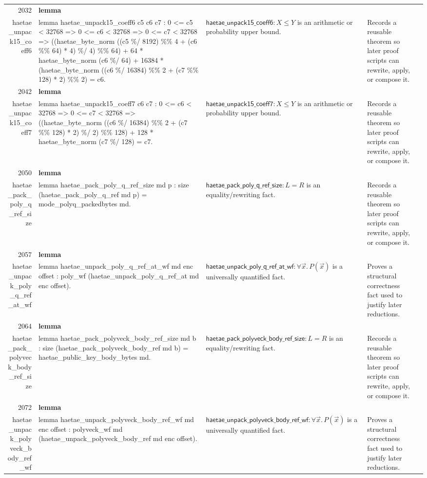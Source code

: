 \documentclass[10pt]{article}
\newcommand{\ec}[1]{\begingroup\ttfamily\scriptsize #1\endgroup}
\begin{document}
\begin{longtable}{r L{0.17\textwidth} L{0.26\textwidth} L{0.27\textwidth} L{0.20\textwidth}}
2032 & \textbf{lemma}\\\ec{haetae\_unpack15\_coeff6} & \ec{lemma haetae\_unpack15\_coeff6 c5 c6 c7 : 0 <= c5 < 32768 => 0 <= c6 < 32768 => 0 <= c7 < 32768 => ((haetae\_byte\_norm ((c5 \%/ 8192) \%\% 4 + (c6 \%\% 64) * 4) \%/ 4) \%\% 64) + 64 * haetae\_byte\_norm (c6 \%/ 64) + 16384 * (haetae\_byte\_norm ((c6 \%/ 16384) \%\% 2 + (c7 \%\% 128) * 2) \%\% 2) = c6.} & \(\mathsf{haetae\_unpack15\_coeff6} : X \le Y\) is an arithmetic or probability upper bound. & Records a reusable theorem so later proof scripts can rewrite, apply, or compose it. \\
2042 & \textbf{lemma}\\\ec{haetae\_unpack15\_coeff7} & \ec{lemma haetae\_unpack15\_coeff7 c6 c7 : 0 <= c6 < 32768 => 0 <= c7 < 32768 => ((haetae\_byte\_norm ((c6 \%/ 16384) \%\% 2 + (c7 \%\% 128) * 2) \%/ 2) \%\% 128) + 128 * haetae\_byte\_norm (c7 \%/ 128) = c7.} & \(\mathsf{haetae\_unpack15\_coeff7} : X \le Y\) is an arithmetic or probability upper bound. & Records a reusable theorem so later proof scripts can rewrite, apply, or compose it. \\
2050 & \textbf{lemma}\\\ec{haetae\_pack\_poly\_q\_ref\_size} & \ec{lemma haetae\_pack\_poly\_q\_ref\_size md p : size (haetae\_pack\_poly\_q\_ref md p) = mode\_polyq\_packedbytes md.} & \(\mathsf{haetae\_pack\_poly\_q\_ref\_size} : L = R\) is an equality/rewriting fact. & Records a reusable theorem so later proof scripts can rewrite, apply, or compose it. \\
2057 & \textbf{lemma}\\\ec{haetae\_unpack\_poly\_q\_ref\_at\_wf} & \ec{lemma haetae\_unpack\_poly\_q\_ref\_at\_wf md enc offset : poly\_wf (haetae\_unpack\_poly\_q\_ref\_at md enc offset).} & \(\mathsf{haetae\_unpack\_poly\_q\_ref\_at\_wf} : \forall \vec{x}.\, P(\vec{x})\) is a universally quantified fact. & Proves a structural correctness fact used to justify later reductions. \\
2064 & \textbf{lemma}\\\ec{haetae\_pack\_polyveck\_body\_ref\_size} & \ec{lemma haetae\_pack\_polyveck\_body\_ref\_size md b : size (haetae\_pack\_polyveck\_body\_ref md b) = haetae\_public\_key\_body\_bytes md.} & \(\mathsf{haetae\_pack\_polyveck\_body\_ref\_size} : L = R\) is an equality/rewriting fact. & Records a reusable theorem so later proof scripts can rewrite, apply, or compose it. \\
2072 & \textbf{lemma}\\\ec{haetae\_unpack\_polyveck\_body\_ref\_wf} & \ec{lemma haetae\_unpack\_polyveck\_body\_ref\_wf md enc offset : polyveck\_wf md (haetae\_unpack\_polyveck\_body\_ref md enc offset).} & \(\mathsf{haetae\_unpack\_polyveck\_body\_ref\_wf} : \forall \vec{x}.\, P(\vec{x})\) is a universally quantified fact. & Proves a structural correctness fact used to justify later reductions. \\

\end{longtable}
\end{document}
